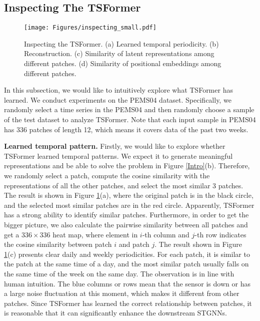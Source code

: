 \documentclass[sigconf]{acmart}
\begin{document}
\subsection{Inspecting The TSFormer}
\label{sec_inspecting}

\begin{figure}[t]
    \setlength{\abovecaptionskip}{0.2cm}
    \setlength{\belowcaptionskip}{-0.4cm}
  \centering
  \texttt{[image: Figures/inspecting\_small.pdf]}
  \caption{Inspecting the TSFormer. (a) Learned temporal periodicity. (b) Reconstruction. (c) Similarity of  latent representations among different patches. (d) Similarity of positional embeddings among different patches.}
  \label{inspecting}
\end{figure}

In this subsection, we would like to intuitively explore what TSFormer has learned.
We conduct experiments on the PEMS04 dataset.
Specifically, we randomly select a time series in the PEMS04 and then randomly choose a sample of the test dataset to analyze TSFormer.
Note that each input sample in PEMS04 has 336 patches of length 12, which means it covers data of the past two weeks.

\noindent\textbf{Learned temporal pattern.}
Firstly, we would like to explore whether TSFormer learned temporal patterns.
We expect it to generate meaningful representations and be able to solve the problem in Figure \ref{Intro}(b).
Therefore, we randomly select a patch, compute the cosine similarity with the representations of all the other patches, and select the most similar 3 patches. The result is shown in Figure \ref{inspecting}(a), where the original patch is in the black circle, and the selected most similar patches are in the red circle. 
Apparently, TSFormer has a strong ability to identify similar patches.
Furthermore, in order to get the bigger picture, we also calculate the pairwise similarity between all patches and get a $336\times 336$ heat map, where element in $i$-th column and $j$-th row indicates the cosine similarity between patch $i$ and patch $j$.
The result shown in Figure \ref{inspecting}(c) presents clear daily and weekly periodicities.
For each patch, it is similar to the patch at the same time of a day, and the most similar patch usually falls on the same time of the week on the same day. 
The observation is in line with human intuition.
The blue columns or rows mean that the sensor is down or has a large noise fluctuation at this moment, which makes it different from other patches.
Since TSFormer has learned the correct relationship between patches, it is reasonable that it can significantly enhance the downstream STGNNs.
\end{document}
